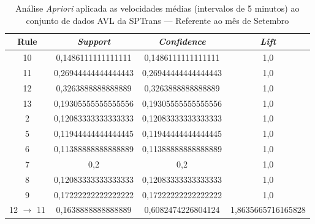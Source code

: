 \documentclass[
	12pt,				%
	oneside,			%
	a4paper,			%
	english,			%
	brazil				%
	]{abntex2ppgsi}
\begin{document}
\begin{apendicesenv}
\begin{table}[!htb]
\centering
\caption {Análise \textit{Apriori} aplicada as velocidades médias (intervalos de 5 minutos) ao conjunto de dados AVL da SPTrans --- Referente ao mês de Setembro}
\label {tab:aprioriSeptember}
\begin{tabular}{c|c|c|c}
\hline
\textbf{Rule} & \textit{\textbf{Support}} & \textit{\textbf{Confidence}} & \textit{\textbf{Lift}} \\
\hline
10 &  0,1486111111111111 &  0,1486111111111111 &  1,0\\
\hline
11 &  0,26944444444444443 &  0,26944444444444443 &  1,0\\
\hline
12 &  0,3263888888888889 &  0,3263888888888889 &  1,0\\
\hline
13 &  0,19305555555555556 &  0,19305555555555556 &  1,0\\
\hline
2 &  0,12083333333333333 &  0,12083333333333333 &  1,0\\
\hline
5 &  0,11944444444444445 &  0,11944444444444445 &  1,0\\
\hline
6 &  0,11388888888888889 &  0,11388888888888889 &  1,0\\
\hline
7 &  0,2 &  0,2 &  1,0\\
\hline
8 &  0,12083333333333333 &  0,12083333333333333 &  1,0\\
\hline
9 &  0,17222222222222222 &  0,17222222222222222 &  1,0\\
\hline
12 $\rightarrow$ 11 &  0,1638888888888889 &  0,6082474226804124 &  1,8635665716165828\\
\hline
\end{tabular}
\end{table}



\end{apendicesenv}
\end{document}
